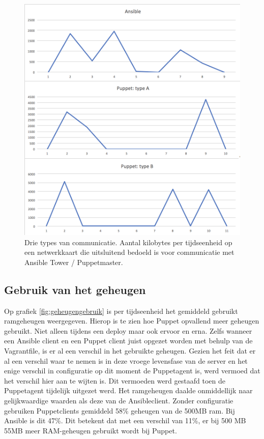 \begin{figure}
  \includegraphics[width=\linewidth]{img/deploytypes.png}
 \caption{Drie types van communicatie. Aantal kilobytes per tijdseenheid op een netwerkkaart die uitsluitend bedoeld is voor communicatie met Ansible Tower / Puppetmaster. }  
  \label{fig:deploytypes}
\end{figure}

\subsection{Gebruik van het geheugen}

Op grafiek \ref{fig:geheugengebruik} is per tijdseenheid het gemiddeld gebruikt ramgeheugen weergegeven. Hierop is te zien hoe Puppet opvallend meer geheugen gebruikt. Niet alleen tijdens een deploy maar ook ervoor en erna. Zelfs wanneer een Ansible client en een Puppet client juist opgezet worden met behulp van de Vagrantfile, is er al een verschil in het gebruikte geheugen. Gezien het feit dat er al een verschil waar te nemen is in deze vroege levensfase van de server en het enige verschil in configuratie op dit moment de Puppetagent is, werd vermoed dat het verschil hier aan te wijten is. Dit vermoeden werd gestaafd toen de Puppetagent tijdelijk uitgezet werd. Het ramgeheugen daalde onmiddellijk naar gelijkwaardige waarden als deze van de Ansibleclient. Zonder configuratie gebruiken Puppetclients gemiddeld 58\% geheugen van de 500MB ram. Bij Ansible is dit 47\%. Dit betekent dat met een verschil van 11\%, er bij 500 MB 55MB meer RAM-geheugen gebruikt wordt bij Puppet.


